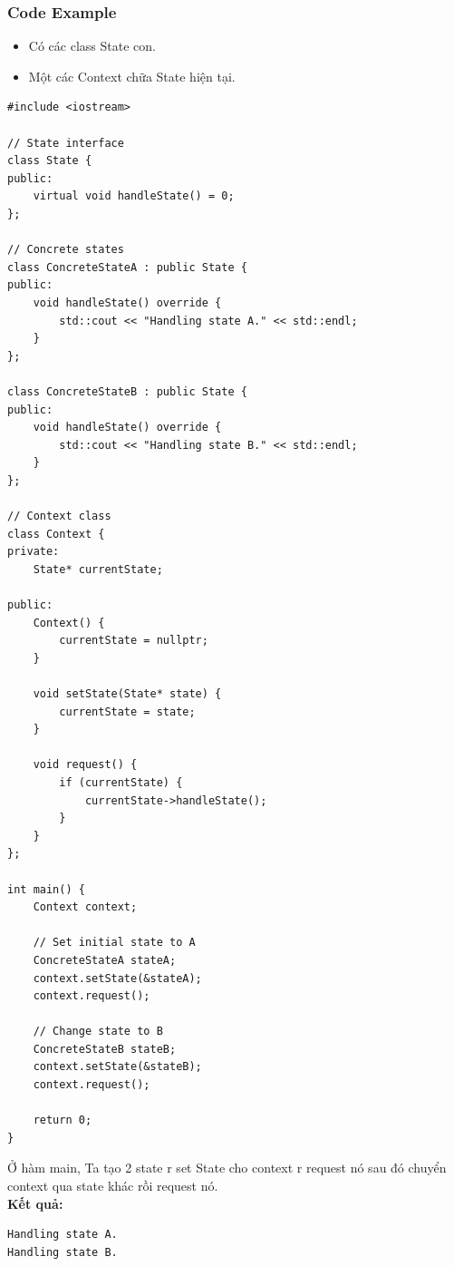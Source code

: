 \subsubsection{Code Example}
\begin{itemize}
    \item Có các class State con.
    \item Một các Context chữa State hiện tại.
\end{itemize}
\begin{lstlisting}
#include <iostream>

// State interface
class State {
public:
    virtual void handleState() = 0;
};

// Concrete states
class ConcreteStateA : public State {
public:
    void handleState() override {
        std::cout << "Handling state A." << std::endl;
    }
};

class ConcreteStateB : public State {
public:
    void handleState() override {
        std::cout << "Handling state B." << std::endl;
    }
};

// Context class
class Context {
private:
    State* currentState;

public:
    Context() {
        currentState = nullptr;
    }

    void setState(State* state) {
        currentState = state;
    }

    void request() {
        if (currentState) {
            currentState->handleState();
        }
    }
};

int main() {
    Context context;

    // Set initial state to A
    ConcreteStateA stateA;
    context.setState(&stateA);
    context.request();

    // Change state to B
    ConcreteStateB stateB;
    context.setState(&stateB);
    context.request();

    return 0;
}

\end{lstlisting}
Ở hàm main, Ta tạo 2 state r set State cho context r request nó sau đó chuyển context qua state khác rồi request nó.\\
\newline
\textbf{Kết quả:}
\begin{lstlisting}
Handling state A.
Handling state B.
\end{lstlisting}
